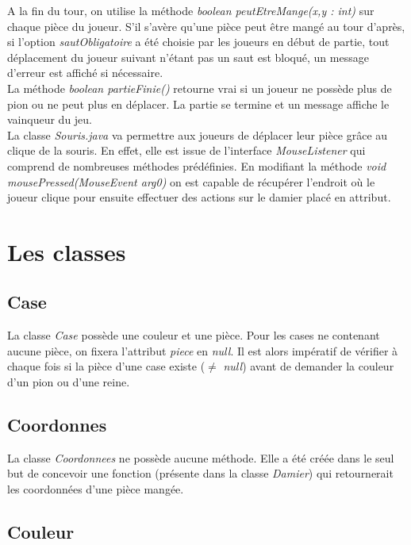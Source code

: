 \documentclass[12,french]{report}
\begin{document}
A la fin du tour, on utilise la méthode \textit{boolean peutEtreMange(x,y : int)} sur chaque pièce du joueur. S'il s'avère qu'une pièce peut être mangé au tour d'après, si l'option \textit{sautObligatoire} a été choisie par les joueurs en début de partie, tout déplacement du joueur suivant n'étant pas un saut est bloqué, un message d'erreur est affiché si nécessaire.\\

La méthode \textit{boolean partieFinie()} retourne vrai si un joueur ne possède plus de pion ou ne peut plus en déplacer. La partie se termine et un message affiche le vainqueur du jeu.\\

La classe \textit{Souris.java} va permettre aux joueurs de déplacer leur pièce grâce au clique de la souris. En effet, elle est issue de l'interface \textit{MouseListener} qui comprend de nombreuses méthodes prédéfinies. En modifiant la méthode \textit{void mousePressed(MouseEvent arg0)} on est capable de récupérer l'endroit où le joueur clique pour ensuite effectuer des actions sur le damier placé en attribut.


\chapter{Les classes}

\section{Case}

La classe \textit{Case} possède une couleur et une pièce. Pour les cases ne contenant aucune pièce, on fixera l'attribut \textit{piece} en \textit{null}. Il est alors impératif de vérifier à chaque fois si la pièce d'une case existe ($\neq$ \textit{null}) avant de demander la couleur d'un pion ou d'une reine.


\section{Coordonnes}

La classe \textit{Coordonnees} ne possède aucune méthode. Elle a été créée dans le seul but de concevoir une fonction (présente dans la classe \textit{Damier}) qui retournerait les coordonnées d'une pièce mangée.

\section{Couleur}
\end{document}
